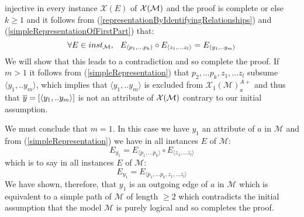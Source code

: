 \documentclass[10pt,a4paper]{article}
\newcommand{\genericmodel}{\mathcal{M}}
\newcommand{\logtophys}{\mathcal{X}}
\newcommand{\chiOne}[1]{{\mathcal{X}_1}(\genericmodel)^{A+}_{#1}}
\begin{document}
injective in every instance $\logtophys(E)$ of $\genericphysical$ and the proof is complete 
\noindent or else $k \geq 1$ and it follows from (\ref{representationByIdentifyingRelationships}) and (\ref{simpleRepresentationOfFirstPart}) that:
\begin{equation} 
\label{simpleRepresentation}
\ineveryinstance  E_{\langle p_1,...p_k \rangle} \circ E_{\langle z_1,...z_l \rangle} = E_{\langle y_1,..y_m \rangle} 
\end{equation}
\noindent We will show that this leads to a contradiction and so complete the proof. If $m >1$ it follows 
 from  (\ref{simpleRepresentation}) 
that $p_2,...p_k,z_1,...z_l$ subsume $\langle y_1,..y_m \rangle$, 
which implies that $\langle y_1,..y_m \rangle$ is excluded from $\chiOne{a}$ and thus that 
 $\overline{y}=\left[\langle y_1,..y_m \rangle\right]$ is not an attribute of $\genericphysical$ contrary to our 
initial assumption. 

We must conclude that $m=1$.
In this case we have $y_1$ an attribute of $a$ in $\genericmodel$ and from (\ref{simpleRepresentation})  we have in all instances $E$ of $\genericmodel$:
\begin{equation}
E_{y_1}=E_{\langle p_1,...p_k \rangle} \circ E_{\langle z_1,...z_l \rangle}
\end{equation}
\noindent which is to say in all instances $E$ of $\genericmodel$:
\begin{equation}
E_{y_1}=E_{\langle p_1,...p_k ,z_1,...z_l \rangle}
\end{equation}
\noindent
We have shown, therefore, that $y_1$ is an outgoing edge of $a$ in $\genericmodel$ 
which is equivalent to a simple path of $\genericmodel$ of length $\geq 2$ which contradicts  the 
 initial assumption that the model $\genericmodel$ is purely logical and so completes the proof.
\end{document}
